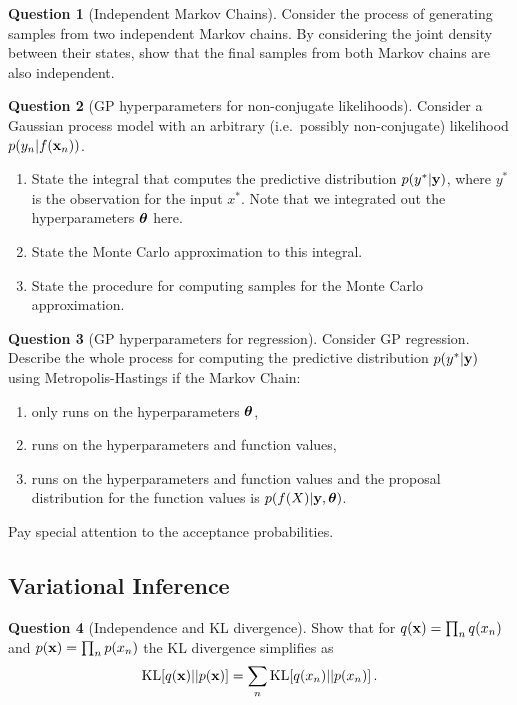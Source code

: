 \documentclass[a4paper]{article}
\theoremstyle{definition}
\newtheorem{question}{Question}
\begin{document}
\begin{question}[Independent Markov Chains]
\label{q:independent-chains}
Consider the process of generating samples from two independent Markov chains. By considering the joint density between their states, show that the final samples from both Markov chains are also independent.
\end{question}

\begin{question}[GP hyperparameters for non-conjugate likelihoods]
\label{q:hyperparam-non-conjugate-gp-likelihoods}
Consider a Gaussian process model with an arbitrary (i.e.~possibly non-conjugate) likelihood $p(y_n|f(\mathbf{x}_n))$.
\begin{enumerate}
  \item State the integral that computes the predictive distribution $p(y^*|\mathbf{y})$, where $y^*$ is the observation for the input $x^*$. Note that we integrated out the hyperparameters $\boldsymbol{\theta}$ here.
  \item State the Monte Carlo approximation to this integral.
  \item State the procedure for computing samples for the Monte Carlo approximation.
\end{enumerate}
\end{question}


\begin{question}[GP hyperparameters for regression]
Consider GP regression. Describe the whole process for computing the predictive distribution $p(y^*|\mathbf{y})$ using Metropolis-Hastings if the Markov Chain:
\begin{enumerate}
  \item only runs on the hyperparameters $\boldsymbol{\theta}$,
  \item runs on the hyperparameters and function values,
  \item runs on the hyperparameters and function values and the proposal distribution for the function values is $p(f(X)|\mathbf{y}, \boldsymbol{\theta})$.
\end{enumerate}
Pay special attention to the acceptance probabilities.
\end{question}



\subsection{Variational Inference}
\begin{question}[Independence and KL divergence]
Show that for $q(\mathbf{x}) = \prod_n q(x_n)$ and $p(\mathbf{x}) = \prod_n p(x_n)$ the KL divergence simplifies as
\begin{align}
\KL{q(\vx)}{p(\vx)} = \sum_n \KL{q(x_n)}{p(x_n)} \,.
\end{align}
\end{question}
\end{document}
